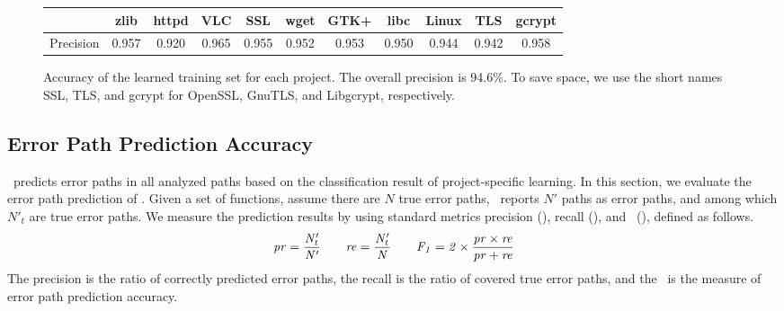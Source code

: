 \documentclass[12pt]{report}	%
\begin{document}
\begin{figure}[t]
\centering
\begin{tabular}{l | c | c | c |c |c|c|c|c|c|c}
\toprule
& zlib & httpd & VLC & SSL & wget & GTK+ & libc & Linux & TLS & gcrypt \\
\midrule
Precision & 0.957 & 0.920 & 0.965 & 0.955 & 0.952 & 0.953 & 0.950 & 0.944 & 0.942 & 0.958 \\
\bottomrule
\end{tabular}
\caption{Accuracy of the learned training set for each project.
The overall precision is 94.6\%.
To save space, we use the short names SSL, TLS, and gcrypt for
OpenSSL, GnuTLS, and Libgcrypt, respectively.}
\label{tab:evallabeling}
\end{figure}

\subsection{Error Path Prediction Accuracy}
\label{sec:app:eval:phase2}

\newTool\ predicts error paths in all analyzed paths based on the classification result 
of project-specific learning.
In this section, we evaluate the error path prediction of \newTool.
%
%
Given a set of functions, assume there are $N$ true error paths,
\newTool\ reports $N'$ paths as error paths, and among which 
$N'_t$ are true error paths.
We measure the prediction results by using standard metrics precision
(\pr), recall (\re), and \accu\ (\fone), defined as follows.
\[
\it{pr} = \frac{N'_t}{N'} 
\qquad
\it{re} = \frac{N'_t}{N}
\qquad
\it{\ensuremath{F_1}} = 2 \times \frac{\it{pr} \times \it{re}}{\it{pr} + \it{re}}
\]
%
The precision is the ratio of correctly predicted error paths,
the recall is the ratio of covered true error paths, and the 
\fone\ is the measure of error path prediction accuracy.
\end{document}
